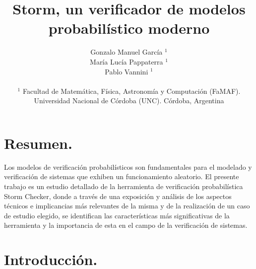 \documentclass[11pt]{article}
\title{\textbf{Storm, un verificador de modelos probabil\'istico moderno}}
\author{Gonzalo Manuel Garc\'ia $^{1}$\\
		Mar\'ia Luc\'ia Pappaterra $^{1}$\\
		Pablo Vannini $^{1}$ \\ \\
		\small{$^{1}$ Facultad de Matem\'atica, F\'isica, Astronom\'ia y Computaci\'on (FaMAF).}\\ \small {Universidad Nacional de C\'ordoba (UNC). C\'ordoba, Argentina} }
\date{}
\begin{document}
\maketitle





\section{Resumen.}

Los modelos de verificaci\'on probabil\'isticos son fundamentales para el modelado y verificaci\'on de sistemas que exhiben un funcionamiento aleatorio. El presente trabajo es un estudio detallado de la herramienta de verificaci\'on probabil\'istica Storm Checker, donde a trav\'es de una exposici\'on y an\'alisis de los aspectos t\'ecnicos e implicancias m\'as relevantes de la misma y de la realizaci\'on de un caso de estudio elegido, se identifican las caracter\'isticas m\'as significativas de la herramienta y la importancia de esta en el campo de la verificaci\'on de sistemas.

\section{Introducci\'on.}
\end{document}
